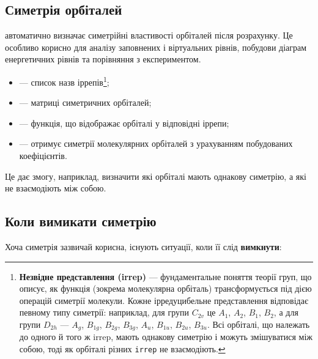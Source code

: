 \subsection{Симетрія орбіталей}

\PySCF{} автоматично визначає симетрійні властивості орбіталей після розрахунку.
Це особливо корисно для аналізу заповнених і віртуальних рівнів, побудови діаграм енергетичних рівнів та порівняння з експериментом.


\begin{commentbox}
	\begin{itemize}
		\item {} --- список назв іррепів\footnote{\textbf{Незвідне представлення (irrep)} --- фундаментальне поняття теорії груп, що описує, як функція (зокрема молекулярна орбіталь) трансформується під дією операцій симетрії молекули.
			      Кожне ірредуцибельне представлення відповідає певному типу симетрії: наприклад, для групи $C_{2v}$ це $A_1$, $A_2$, $B_1$, $B_2$, а для групи $D_{2h}$ --- $A_g$, $B_{1g}$, $B_{2g}$, $B_{3g}$, $A_u$, $B_{1u}$, $B_{2u}$, $B_{3u}$.
			      Всі орбіталі, що належать до одного й того ж irrep, мають однакову симетрію і можуть змішуватися між собою, тоді як орбіталі різних \texttt{irrep} не взаємодіють.};
		\item {} --- матриці симетричних орбіталей;
		\item {} --- функція, що відображає орбіталі у відповідні іррепи;
		\item {} --- отримує симетрії молекулярних орбіталей з урахуванням побудованих коефіцієнтів.
	\end{itemize}
\end{commentbox}

Це дає змогу, наприклад, визначити які орбіталі мають однакову симетрію, а які не взаємодіють між собою.

\subsection{Коли вимикати симетрію}

Хоча симетрія зазвичай корисна, існують ситуації, коли її слід \textbf{вимкнути}:

